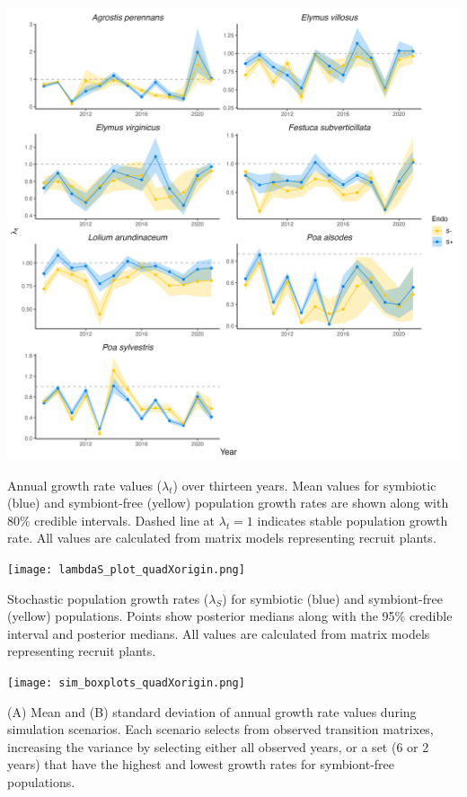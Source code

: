 \documentclass[lineno, sn-basic]{sn-jnl}%
\begin{document}
\begin{myfigure}[H]
	\centering
	\includegraphics[width=\linewidth]{lambda_timeseries_plot.png}
	\caption[Annual growth rate values ($\lambda_{t}$) over thirteen years]{Annual growth rate values ($\lambda_{t}$) over thirteen years. Mean values for symbiotic (blue) and symbiont-free (yellow) population growth rates are shown along with $80\%$ credible intervals. Dashed line at $\lambda_{t} = 1$ indicates stable population growth rate. All values are calculated from matrix models representing recruit plants.}
\end{myfigure}


\begin{myfigure}[H]
	\centering
	\texttt{[image: lambdaS\_plot\_quadXorigin.png]}
	\caption[Stochastic population growth rates ($\lambda_S$) for symbiotic and symbiont-free populations]{Stochastic population growth rates ($\lambda_S$) for symbiotic (blue) and symbiont-free (yellow) populations. Points show posterior medians along with the 95\% credible interval and posterior medians. All values are calculated from matrix models representing recruit plants.}
\end{myfigure}


\begin{myfigure}[H]
	\centering
	\texttt{[image: sim\_boxplots\_quadXorigin.png]}
	\caption[Mean and standard deviation of annual growth rate values during simulation scenarios]{(A) Mean and (B) standard deviation of annual growth rate values during simulation scenarios. Each scenario selects from observed transition matrixes, increasing the variance by selecting either all observed years, or a set (6 or 2 years) that have the highest and lowest growth rates for symbiont-free populations.}
\end{myfigure}
\end{document}
